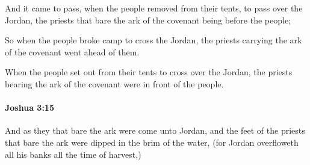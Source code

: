 			\begin{versebox}
					\item[BHS] 
					\item[ASV] And it came to pass, when the people removed from their tents, to pass over the Jordan, the priests that bare the ark of the covenant being before the people;
					\item[NIV] So when the people broke camp to cross the Jordan, the priests carrying the ark of the covenant went ahead of them.
					\item[NRSV] When the people set out from their tents to cross over the Jordan, the priests bearing the ark of the covenant were in front of the people.
			\end{versebox}

		\paragraph{Joshua 3:15} %
			\label{JOSHUA-3-15}

			And as they that bare the ark were come unto Jordan, and the feet of the priests that bare the ark were dipped in the brim of the water, (for Jordan overfloweth all his banks all the time of harvest,)

